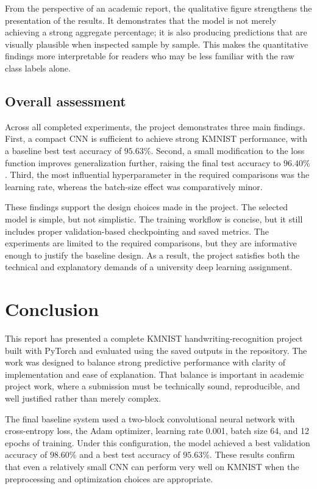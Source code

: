 \documentclass[conference]{IEEEtran}
\begin{document}
From the perspective of an academic report, the qualitative figure strengthens the presentation of the results. It demonstrates that the model is not merely achieving a strong aggregate percentage; it is also producing predictions that are visually plausible when inspected sample by sample. This makes the quantitative findings more interpretable for readers who may be less familiar with the raw class labels alone.

\subsection{Overall assessment}

Across all completed experiments, the project demonstrates three main findings. First, a compact CNN is sufficient to achieve strong KMNIST performance, with a baseline best test accuracy of $95.63\%$. Second, a small modification to the loss function improves generalization further, raising the final test accuracy to $96.40\%$. Third, the most influential hyperparameter in the required comparisons was the learning rate, whereas the batch-size effect was comparatively minor.

These findings support the design choices made in the project. The selected model is simple, but not simplistic. The training workflow is concise, but it still includes proper validation-based checkpointing and saved metrics. The experiments are limited to the required comparisons, but they are informative enough to justify the baseline design. As a result, the project satisfies both the technical and explanatory demands of a university deep learning assignment.

\section{Conclusion}

This report has presented a complete KMNIST handwriting-recognition project built with PyTorch and evaluated using the saved outputs in the repository. The work was designed to balance strong predictive performance with clarity of implementation and ease of explanation. That balance is important in academic project work, where a submission must be technically sound, reproducible, and well justified rather than merely complex.

The final baseline system used a two-block convolutional neural network with cross-entropy loss, the Adam optimizer, learning rate 0.001, batch size 64, and 12 epochs of training. Under this configuration, the model achieved a best validation accuracy of $98.60\%$ and a best test accuracy of $95.63\%$. These results confirm that even a relatively small CNN can perform very well on KMNIST when the preprocessing and optimization choices are appropriate.
\end{document}
